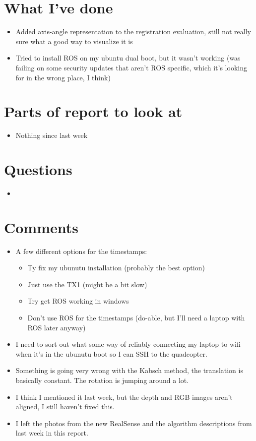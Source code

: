 \documentclass[12pt,a4paper]{article}
\begin{document}
\author{Katrina Ashton}


\pagestyle{fancy}
\fancyhf{}
\rhead{\thepage}

\section{What I've done}
\begin{itemize}
\item Added axis-angle representation to the registration evaluation, still not really sure what a good way to visualize it is
\item Tried to install ROS on my ubuntu dual boot, but it wasn't working (was failing on some security updates that aren't ROS specific, which it's looking for in the wrong place, I think)
\end{itemize}

\section{Parts of report to look at}
\begin{itemize}
\item Nothing since last week
\end{itemize}

\section{Questions}
\begin{itemize}
\item
\end{itemize}

\section{Comments}
\begin{itemize}
\item A few different options for the timestamps:
\begin{itemize}
\item Ty fix my ubunutu installation (probably the best option)
\item Just use the TX1 (might be a bit slow)
\item Try get ROS working in windows 
\item Don't use ROS for the timestamps (do-able, but I'll need a laptop with ROS later anyway)
\end{itemize}
\item I need to sort out what some way of reliably connecting my laptop to wifi when it's in the ubunutu boot so I can SSH to the quadcopter. 
\item Something is going very wrong with the Kabsch method, the translation is basically constant. The rotation is jumping around a lot. 
\item I think I mentioned it last week, but the depth and RGB images aren't aligned, I still haven't fixed this.
\item I left the photos from the new RealSense and the algorithm descriptions from last week in this report.
\end{itemize}
\end{document}
